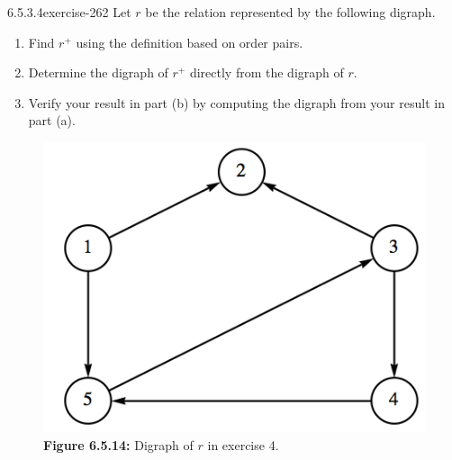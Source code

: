 \documentclass[twoside,10pt,]{book}
\numberwithin{equation}{section}
\begin{document}
\begin{divisionsolution}{6.5.3.4}{}{exercise-262}%
\hypertarget{p-2217}{}%
Let \(r\) be the relation represented by the following digraph.%
\par
\hypertarget{p-2218}{}%
\leavevmode%
\begin{enumerate}[label=(\alph*)]
\item\hypertarget{li-1161}{}\hypertarget{p-2219}{}%
Find \(r^+\) using the definition based on order pairs.%
\item\hypertarget{li-1162}{}\hypertarget{p-2220}{}%
Determine the digraph of \(r^+\) directly from the digraph of \(r\).%
\item\hypertarget{li-1163}{}\hypertarget{p-2221}{}%
Verify your result in part (b) by computing the digraph from your result in part (a).%
\end{enumerate}
%
\begin{figure}
\centering
\includegraphics[width=0.9\linewidth]{images/fig-exercise-6-5-4.png}
\caption*{\textbf{Figure 6.5.14:} Digraph of \(r\) in exercise 4.}
\end{figure}
\end{divisionsolution}%
\end{document}
